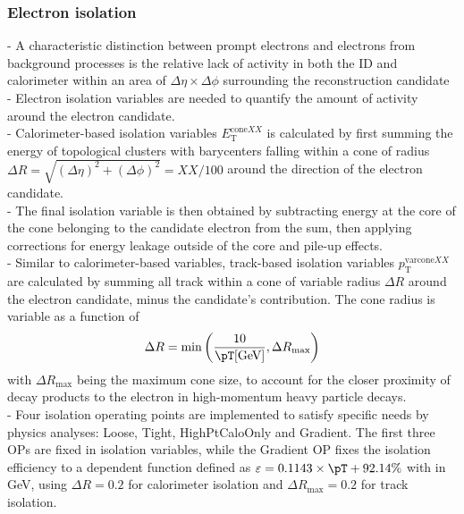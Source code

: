 \documentclass[../thesis.tex]{subfiles}
\begin{document}
\subsubsection*{Electron isolation}
\label{sec:eiso}
- A characteristic distinction between prompt electrons and electrons from background processes is the relative lack of activity in both the ID and calorimeter within an area of $\Delta \eta \times \Delta \phi$ surrounding the reconstruction candidate\\
- Electron isolation variables are needed to quantify the amount of activity around the electron candidate.\\
- Calorimeter-based isolation variables $E_\mathrm{T}^{\mathrm{cone}XX}$ is calculated by first summing the energy of topological clusters with barycenters falling within a cone of radius $\Delta R = \sqrt{(\Delta \eta)^2+(\Delta \phi)^2}=XX/100$ around the direction of the electron candidate.\\
- The final isolation variable is then obtained by subtracting energy at the core of the cone belonging to the candidate electron from the sum, then applying corrections for energy leakage outside of the core and pile-up effects.\\
- Similar to calorimeter-based variables, track-based isolation variables $p_\mathrm{T}^{\mathrm{varcone}XX}$ are calculated by summing all track \pT within a cone of variable radius $\Delta R$ around the electron candidate, minus the candidate's contribution. The cone radius is variable as a function of \pT
$$\Delta R = \min \left(\frac{10}{\pT \mathrm{ [GeV]}}, \Delta R_{\max} \right)$$
with $\Delta R_{\max}$ being the maximum cone size, to account for the closer proximity of decay products to the electron in high-momentum heavy particle decays.\\
- Four isolation operating points are implemented to satisfy specific needs by physics analyses: Loose, Tight, HighPtCaloOnly and Gradient. The first three OPs are fixed in isolation variables, while the Gradient OP fixes the isolation efficiency to a \pT dependent function defined as $ \varepsilon = 0.1143 \times \pT + 92.14\% $ with \pT in GeV, using $\Delta R=0.2$ for calorimeter isolation and $\Delta R_{\max}=0.2$ for track isolation.
\end{document}
